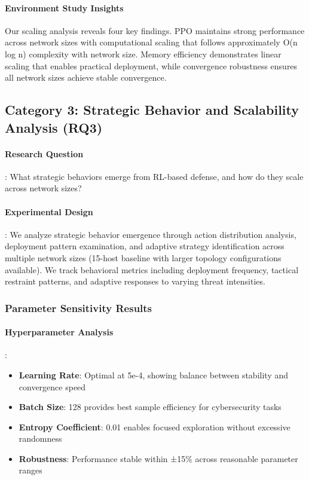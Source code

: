 \documentclass[12pt,oneside]{article}
\begin{document}
\paragraph{Environment Study Insights} Our scaling analysis reveals four key findings. PPO maintains strong performance across network sizes with computational scaling that follows approximately O(n log n) complexity with network size. Memory efficiency demonstrates linear scaling that enables practical deployment, while convergence robustness ensures all network sizes achieve stable convergence.

\subsection{Category 3: Strategic Behavior and Scalability Analysis (RQ3)}

\paragraph{Research Question}: What strategic behaviors emerge from RL-based defense, and how do they scale across network sizes?

\paragraph{Experimental Design}: We analyze strategic behavior emergence through action distribution analysis, deployment pattern examination, and adaptive strategy identification across multiple network sizes (15-host baseline with larger topology configurations available). We track behavioral metrics including deployment frequency, tactical restraint patterns, and adaptive responses to varying threat intensities.

\subsubsection{Parameter Sensitivity Results}

\paragraph{Hyperparameter Analysis}:
\begin{itemize}
\item \textbf{Learning Rate}: Optimal at 5e-4, showing balance between stability and convergence speed
\item \textbf{Batch Size}: 128 provides best sample efficiency for cybersecurity tasks
\item \textbf{Entropy Coefficient}: 0.01 enables focused exploration without excessive randomness
\item \textbf{Robustness}: Performance stable within ±15\% across reasonable parameter ranges
\end{itemize}
\end{document}
